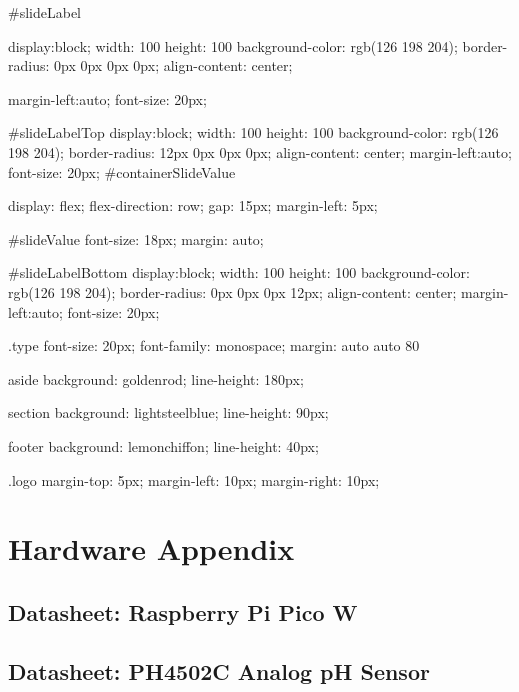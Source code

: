 \documentclass[12pt]{article} %
\begin{document}
\begin{htmlcode}[caption={CSS Stlye Sheet}]
    #slideLabel
    {
       display:block;
       width: 100%
       height: 100%
       background-color: rgb(126 198 204);
       border-radius: 0px 0px 0px 0px;
       align-content: center;
      
       margin-left:auto;
       font-size: 20px;
    }
    
    #slideLabelTop
    {
       display:block;
       width: 100%
       height: 100%
       background-color: rgb(126 198 204);
       border-radius: 12px 0px 0px 0px;
       align-content: center;
       margin-left:auto;
       font-size: 20px;
    }
    #containerSlideValue
    {
      
       display: flex;
       flex-direction: row;
       gap: 15px;
       margin-left: 5px;
    }
    
    #slideValue
    {
       font-size: 18px;
       margin: auto;
    }
    
    
    
    #slideLabelBottom
    {
       display:block;
       width: 100%
       height: 100%
       background-color: rgb(126 198 204);
       border-radius: 0px 0px 0px 12px;
       align-content: center;
       margin-left:auto;
       font-size: 20px;
    }
    
    .type
    {
       font-size: 20px;
       font-family: monospace;
       margin: auto auto 80%
    }
    
    aside 
    {
       background: goldenrod;
       line-height: 180px;
    }
        
    section 
    {
       background: lightsteelblue;
       line-height: 90px;
    }
        
    footer 
    {
       background: lemonchiffon;
       line-height: 40px;
    }
        
    .logo
    {
       margin-top: 5px;
       margin-left: 10px;
       margin-right: 10px;
    }
        
    \end{htmlcode}
\section{Hardware Appendix}
\subsection{Datasheet: Raspberry Pi Pico W}

\pagebreak
\subsection{Datasheet: PH4502C Analog pH Sensor}

\pagebreak
\end{document}
